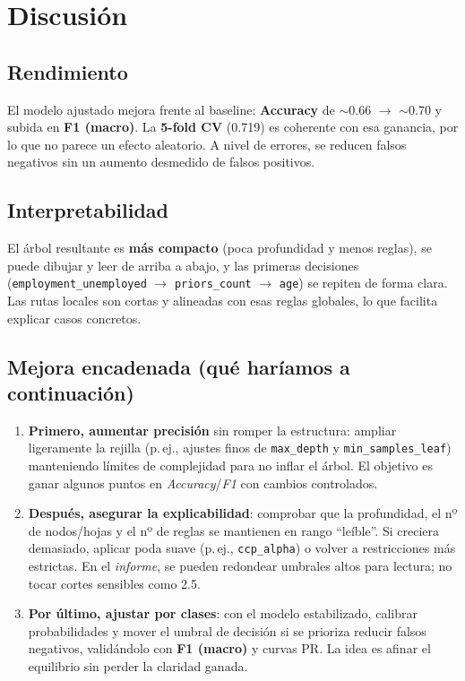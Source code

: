 \section{Discusión}

\subsection*{Rendimiento}
El modelo ajustado mejora frente al baseline: \textbf{Accuracy} de $\sim$0.66 $\rightarrow$ $\sim$0.70 y subida en \textbf{F1 (macro)}. La \textbf{5-fold CV} (0.719) es coherente con esa ganancia, por lo que no parece un efecto aleatorio. A nivel de errores, se reducen falsos negativos sin un aumento desmedido de falsos positivos.

\subsection*{Interpretabilidad}
El árbol resultante es \textbf{más compacto} (poca profundidad y menos reglas), se puede dibujar y leer de arriba a abajo, y las primeras decisiones (\texttt{employment\_unemployed} $\rightarrow$ \texttt{priors\_count} $\rightarrow$ \texttt{age}) se repiten de forma clara. Las rutas locales son cortas y alineadas con esas reglas globales, lo que facilita explicar casos concretos.

\subsection*{Mejora encadenada (qué haríamos a continuación)}
\begin{enumerate}
  \item \textbf{Primero, aumentar precisión} sin romper la estructura: ampliar ligeramente la rejilla (p.\,ej., ajustes finos de \texttt{max\_depth} y \texttt{min\_samples\_leaf}) manteniendo límites de complejidad para no inflar el árbol. El objetivo es ganar algunos puntos en \textit{Accuracy}/\textit{F1} con cambios controlados.
  \item \textbf{Después, asegurar la explicabilidad}: comprobar que la profundidad, el nº de nodos/hojas y el nº de reglas se mantienen en rango “leíble”. Si creciera demasiado, aplicar poda suave (p.\,ej., \texttt{ccp\_alpha}) o volver a restricciones más estrictas. En el \emph{informe}, se pueden redondear umbrales altos para lectura; no tocar cortes sensibles como 2.5.
  \item \textbf{Por último, ajustar por clases}: con el modelo estabilizado, calibrar probabilidades y mover el umbral de decisión si se prioriza reducir falsos negativos, validándolo con \textbf{F1 (macro)} y curvas PR. La idea es afinar el equilibrio sin perder la claridad ganada.
\end{enumerate}

